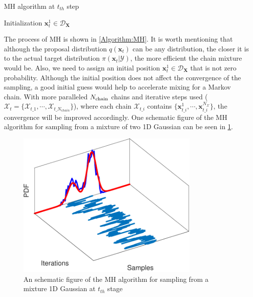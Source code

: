 \begin{algorithm}    
    \caption{\acrlong{MH} algorithm at $t_{th}$ step}
    \label{Algorithm:MH}
    Initialization $\boldsymbol{x}_{t}^{1} \in \mathcal{D}_{\bm{X}}$\; 
\end{algorithm}
The process of \acrshort{MH} is shown in \ref{Algorithm:MH}. It is worth mentioning that although the proposal distribution $q(\boldsymbol{x}_{t})$ can be any distribution, the closer it is to the actual target distribution $\pi(\boldsymbol{x}_{t}|\mathcal{Y})$, the more efficient the chain mixture would be. Also, we need to assign an initial position $\boldsymbol{x}_{t}^{1} \in \mathcal{D}_{\bm{X}}$ that is not zero probability. Although the initial position does not affect the convergence of the sampling, a good initial guess would help to accelerate mixing for a Markov chain. With more paralleled $N_{\rm{chain}}$ chains and iterative steps used ($\mathcal{X}_{t} = \{ \mathcal{X}_{t\_1},\cdots,\mathcal{X}_{t\_N_{chain}}\}$), where each chain $\mathcal{X}_{t\_i}$ contains $\{ \boldsymbol{x}_{t\_i}^{1},\cdots,\boldsymbol{x}_{t\_i}^{N_{\mathcal{X}}}\}$, the convergence will be improved accordingly. One schematic figure of the \acrshort{MH} algorithm for sampling from a mixture of two 1D Gaussian can be seen in \cref{fig: MH_example}.
\begin{figure}[htbp]
    \centering
    \includegraphics[width = 90mm]{Figures/figure-MCMC_sampling.pdf}
    \caption{An schematic figure of the \acrshort{MH} algorithm for sampling from a mixture 1D Gaussian at $t_{th}$ stage}
    \label{fig: MH_example}
\end{figure}
